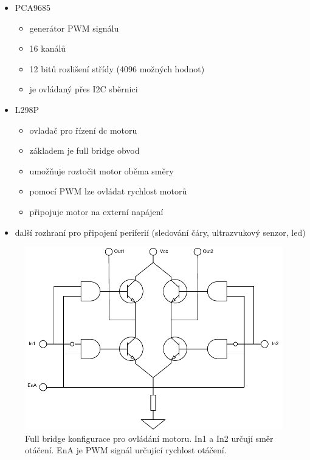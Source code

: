 \begin{itemize}
	\item{PCA9685 \cite{pca9685}}
	\begin{itemize}
		\item{generátor PWM signálu}
		\item{16 kanálů}
		\item{12 bitů rozlišení střídy (4096 možných hodnot)}
		\item{je ovládaný přes I2C sběrnici}
	\end{itemize}
	\item{L298P \cite{l298}}
	\begin{itemize}
		\item{ovladač pro řízení dc motoru}
		\item{základem je full bridge obvod}
		\item{umožňuje roztočit motor oběma směry}
		\item{pomocí PWM lze ovládat rychlost motorů}
		\item{připojuje motor na externí napájení}
	\end{itemize}
	\item{další rozhraní pro připojení periferií (sledování čáry, ultrazvukový senzor, led)}
\end{itemize}

\begin{figure}[h!]
	\centering
	\includegraphics[scale=0.75]{obrazky-figures/motor_full_bridge.pdf}
	\caption[Full bridge ovladač motoru.]{Full bridge konfigurace pro ovládání motoru. In1 a In2 určují směr otáčení. EnA je PWM signál určující rychlost otáčení. \cite{l298}}
	\label{}
\end{figure}

